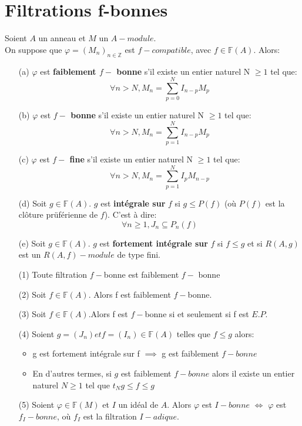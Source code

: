 \section{Filtrations f-bonnes}
\begin{madefinition}
	Soient $A$ un anneau et $M$ un $A-module$.\\
	On suppose que $\varphi=(M_n)_{n \in \mathbb{Z}}$ est $f-compatible$, avec $f \in \mathbb{F}(A)$. Alors:
	\begin{itemize}
		\item[(a)] $\varphi$ est \textbf{faiblement $f-$ bonne} s'il existe un entier naturel N $\geqslant 1$ tel que:
		\[\forall n > N, M_{n}=\sum_{p=0}^{N}I_{n-p}M_{p} \]
		\item[(b)] $\varphi$ est \textbf{$f-$ bonne} s'il existe un entier naturel N $\geqslant 1$ tel que:
		\[\forall n > N, M_{n}=\sum_{p=1}^{N}I_{n-p}M_{p} \]
		\item[(c)] $\varphi$ est \textbf{$f-$ fine} s'il existe un entier naturel N $\geqslant 1$ tel que:
		\[\forall n > N, M_{n}=\sum_{p=1}^{N}I_{p}M_{n-p} \]
		\item[(d)] Soit $g \in \mathbb{F}(A)$. $g$ est \textbf{intégrale sur} $f$ si $g \leqslant P(f)$ (où $P(f)$ est la clôture prüférienne de $f$). C'est à dire:
		\[\forall n \geqslant 1, J_n \subseteq P_{n}(f) \]
		\item[(e)] Soit $g \in \mathbb{F}(A)$. $g$ est \textbf{fortement intégrale sur} $f$ si $f \leqslant g$ et si $R(A,g)$ est un $R(A,f)-module$ de type fini.
	\end{itemize} 
\end{madefinition}
\begin{maremarque}
	\begin{enumerate}
		\item[(1)] Toute filtration $f-$bonne est faiblement $f-$ bonne
		\item[(2)] Soit $f \in \mathbb{F}(A)$. Alors f est faiblement $f-$bonne.
		\item[(3)] Soit $f \in \mathbb{F}(A)$.Alors f est $f-$bonne si et seulement si f est $E.P.$
		\item[(4)] Soient $g=(J_n) et f = (I_n) \in \mathbb{F}(A)$ telles que $f \leqslant g$ alors:
		\begin{itemize}
			\item g est fortement intégrale sur f $\implies$ g est faiblement $f-bonne$
			\item  En d'autres termes, si $g$ est faiblement $f-bonne$ alors il existe un entier naturel $N \geqslant 1$ tel que $t_{N}g \leqslant f \leqslant g$
		\end{itemize}
		\item[(5)] Soient $\varphi \in \mathbb{F}(M)$ et $I$ un idéal de $A$. Alors $\varphi$ est $I-bonne$ $\Longleftrightarrow$ $\varphi$ est $f_{I}-bonne$, où $f_{I}$ est la filtration $I-adique$.
	\end{enumerate}
\end{maremarque}
